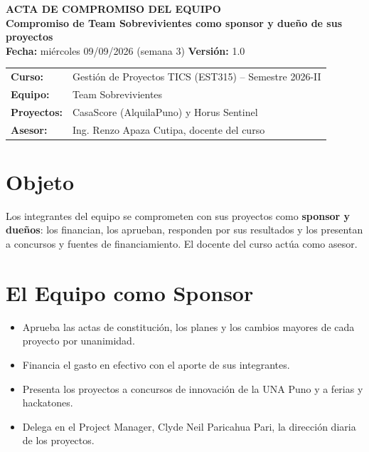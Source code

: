 \documentclass[11pt,a4paper]{article}
\begin{document}
\begin{center}
    {\Large \textbf{\textcolor{AzulUNA}{ACTA DE COMPROMISO DEL EQUIPO}}}\\[3pt]
    {\normalsize \textbf{Compromiso de Team Sobrevivientes como sponsor y dueño de sus proyectos}}\\[4pt]
    \footnotesize \textbf{Fecha:} miércoles 09/09/2026 (semana 3) \quad \textbar\quad \textbf{Versión:} 1.0
\end{center}

\vspace{0.1cm}

\noindent\begin{tabularx}{\textwidth}{@{}P{3.8cm} L@{}}
\toprule
\textbf{Curso:} & Gestión de Proyectos TICS (EST315) -- Semestre 2026-II \\
\textbf{Equipo:} & Team Sobrevivientes \\
\textbf{Proyectos:} & CasaScore (AlquilaPuno) y Horus Sentinel \\
\textbf{Asesor:} & Ing. Renzo Apaza Cutipa, docente del curso \\
\bottomrule
\end{tabularx}

\section{Objeto}
Los integrantes del equipo se comprometen con sus proyectos como \textbf{sponsor y dueños}: los financian, los aprueban, responden por sus resultados y los presentan a concursos y fuentes de financiamiento. El docente del curso actúa como asesor.

\section{El Equipo como Sponsor}
\begin{itemize}[leftmargin=*]
    \item Aprueba las actas de constitución, los planes y los cambios mayores de cada proyecto por unanimidad.
    \item Financia el gasto en efectivo con el aporte de sus integrantes.
    \item Presenta los proyectos a concursos de innovación de la UNA Puno y a ferias y hackatones.
    \item Delega en el Project Manager, Clyde Neil Paricahua Pari, la dirección diaria de los proyectos.
\end{itemize}
\end{document}
